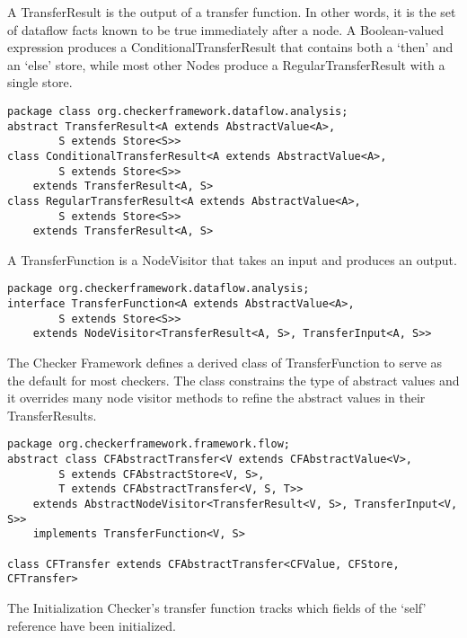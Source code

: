 \label{sec:transfer_result_classes}

A TransferResult is the output of a transfer function.  In other
words, it is the set of dataflow facts known to be true immediately
after a node.  A Boolean-valued expression produces a
ConditionalTransferResult that contains both a `then' and an `else'
store, while most other Nodes produce a RegularTransferResult with a
single store.

\begin{verbatim}
package class org.checkerframework.dataflow.analysis;
abstract TransferResult<A extends AbstractValue<A>,
        S extends Store<S>>
class ConditionalTransferResult<A extends AbstractValue<A>,
        S extends Store<S>>
    extends TransferResult<A, S>
class RegularTransferResult<A extends AbstractValue<A>,
        S extends Store<S>>
    extends TransferResult<A, S>
\end{verbatim}

\label{sec:transfer_function_classes}

A TransferFunction is a NodeVisitor that takes an input and produces an output.

\begin{verbatim}
package org.checkerframework.dataflow.analysis;
interface TransferFunction<A extends AbstractValue<A>,
        S extends Store<S>>
    extends NodeVisitor<TransferResult<A, S>, TransferInput<A, S>>
\end{verbatim}

The Checker Framework defines a derived class of TransferFunction to
serve as the default for most checkers.  The class constrains the type
of abstract values and it overrides many node visitor methods to
refine the abstract values in their TransferResults.

\begin{verbatim}
package org.checkerframework.framework.flow;
abstract class CFAbstractTransfer<V extends CFAbstractValue<V>,
        S extends CFAbstractStore<V, S>,
        T extends CFAbstractTransfer<V, S, T>>
    extends AbstractNodeVisitor<TransferResult<V, S>, TransferInput<V, S>>
    implements TransferFunction<V, S>

class CFTransfer extends CFAbstractTransfer<CFValue, CFStore, CFTransfer>
\end{verbatim}

The Initialization Checker's transfer function tracks which fields of
the `self' reference have been initialized.

